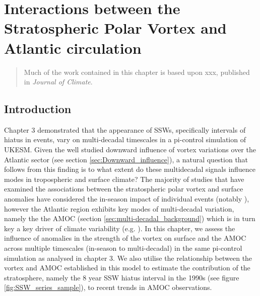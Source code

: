 \chapter{Interactions between the Stratospheric Polar Vortex and Atlantic circulation} 
\begin{quotation}
  Much of the work contained in this chapter is based upon xxx,
  published in \emph{Journal of Climate}.
\end{quotation}

\label{cha:surface}

\section{Introduction}
Chapter 3 demonstrated that the appearance of SSWs, specifically intervals of hiatus in events, vary on multi-decadal timescales in a pi-control simulation of UKESM. Given the well studied downward influence of vortex variations over the Atlantic sector (see section \ref{sec:Downward_influence}), a natural question that follows from this finding is to what extent do these multidecadal signals influence modes in tropospheric and surface climate? The majority of studies that have examined the associations between the stratospheric polar vortex and surface anomalies have considered the in-season impact of individual events (notably \cite{baldwinStratospheric2001a}), however the Atlantic region exhibits key modes of multi-decadal variation, namely the the AMOC (section \ref{sec:multi-decadal_background}) which is in turn key a key driver of climate variability (e.g. \cite{frankignoulInfluence2013b}). In this chapter, we assess the influence of anomalies in the strength of the vortex on surface and the AMOC across multiple timescales (in-season to multi-decadal)
in the same pi-control simulation as analysed in chapter 3. We also utilise the relationship between the vortex and AMOC established in this model to estimate the contribution of the stratosphere, namely the 8 year SSW hiatus interval in the 1990s (see figure \ref{fig:SSW_series_sample}), to recent trends in AMOC observations.


